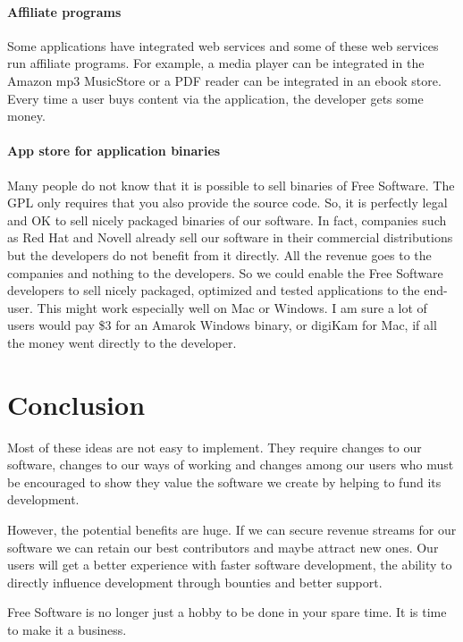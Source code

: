 \paragraph*{Affiliate programs}

Some applications have integrated web services and some of these web services
run affiliate programs. For example, a media player can be integrated in the
Amazon mp3 MusicStore or a PDF reader can be integrated in an ebook store.
Every time a user buys content via the application, the developer gets some
money.

\paragraph*{App store for application binaries}

Many people do not know that it is possible to sell binaries of Free Software.
The GPL only requires that you also provide the source code. So, it is perfectly
legal and OK to sell nicely packaged binaries of our software. In fact,
companies such as Red Hat and Novell already sell our software in their commercial distributions but the developers do not benefit from it directly. All the revenue goes to the companies and nothing to the developers. So we could enable the Free Software developers to sell nicely packaged, optimized and
tested applications to the end-user. This might work especially well on Mac or
Windows. I am sure a lot of users would pay \$3 for an Amarok Windows binary, or
digiKam for Mac, if all the money went directly to the developer.

\section*{Conclusion}

Most of these ideas are not easy to implement. They require changes to our
software, changes to our ways of working and changes among our users who must be
encouraged to show they value the software we create by helping to fund its
development.

However, the potential benefits are huge. If we can secure revenue streams for
our software we can retain our best contributors and maybe attract new ones. Our
users will get a better experience with faster software development, the ability
to directly influence development through bounties and better support.

Free Software is no longer just a hobby to be done in your spare time. It is
time to make it a business.

